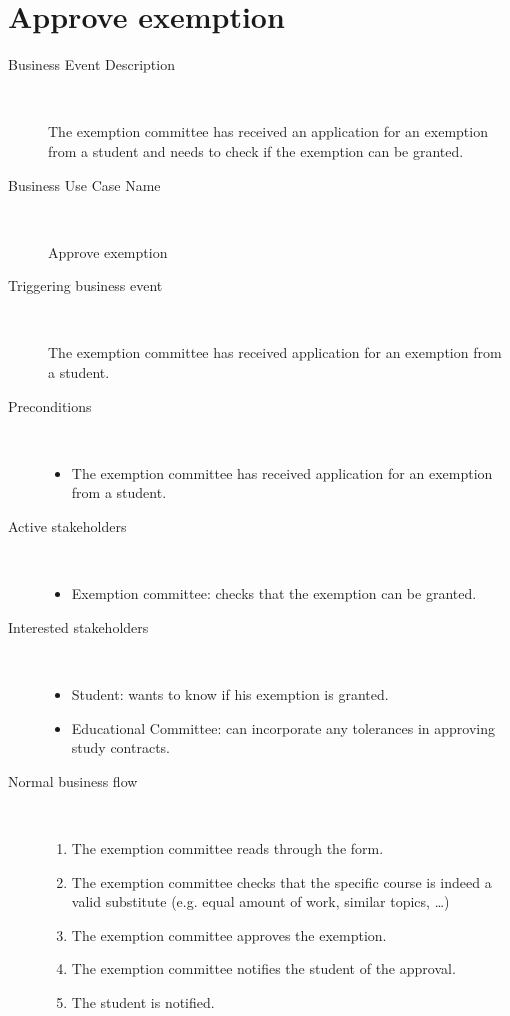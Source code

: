\section{Approve exemption}

\begin{description}
	\item[Business Event Description] \ 
		\par The exemption committee has received an application for an exemption
		from a student and needs to check if the exemption can be granted.
	\item[Business Use Case Name] \ 
		\par Approve exemption
	\item[Triggering business event] \ 
		\par The exemption committee has received application for an exemption from a
		student.
	\item[Preconditions] \
	\begin{itemize}
		\item The exemption committee has received application for an exemption from a
		student.
	\end{itemize}
	\item[Active stakeholders] \ 
	\begin{itemize}
		\item Exemption committee: checks that the exemption can be granted.
	\end{itemize}
	\item[Interested stakeholders] \ 
		\begin{itemize}
		\item Student: wants to know if his exemption is granted.
		\item Educational Committee: can incorporate any tolerances in approving
		study contracts.
		\end{itemize}
	\item[Normal business flow] \ 
	\begin{enumerate}
	  	\item The exemption committee reads through the form. 
	  	\item The exemption committee checks that the specific course is indeed a
	  	valid substitute (e.g. equal amount of work, similar topics, \ldots)
	  	\item The exemption committee approves the exemption.
	  	\item The exemption committee notifies the student of the approval.
	  	\item The student is notified.

\end{enumerate}
\end{description}
